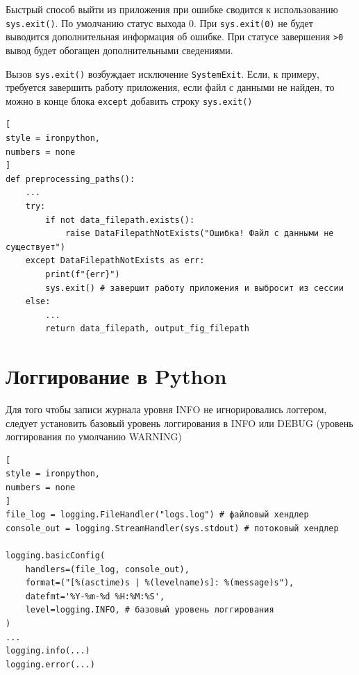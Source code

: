 \documentclass[%
	11pt,
	a4paper,
	utf8,
		]{article}
\begin{document}
Быстрый способ выйти из приложения при ошибке сводится к использованию \texttt{sys.exit()}. По умолчанию статус выхода 0. При \texttt{sys.exit(0)} не будет выводится дополнительная информация об ошибке. При статусе завершения \texttt{>0} вывод будет обогащен дополнительными сведениями.

Вызов \texttt{sys.exit()} возбуждает исключение \texttt{SystemExit}. Если, к примеру, требуется завершить работу приложения, если файл с данными не найден, то можно в конце блока \texttt{except} добавить строку \texttt{sys.exit()}
\begin{lstlisting}[
style = ironpython,
numbers = none	
]
def preprocessing_paths():
    ...
    try:
        if not data_filepath.exists():
            raise DataFilepathNotExists("Ошибка! Файл с данными не существует")
    except DataFilepathNotExists as err:
        print(f"{err}")
        sys.exit() # завершит работу приложения и выбросит из сессии
    else:
        ...
        return data_filepath, output_fig_filepath
\end{lstlisting}


\section{Логгирование в Python}

Для того чтобы записи журнала уровня INFO не игнорировались логгером, следует установить базовый уровень логгирования в INFO или DEBUG (уровень логгирования по умолчанию WARNING)
\begin{lstlisting}[
style = ironpython,
numbers = none	
]
file_log = logging.FileHandler("logs.log") # файловый хендлер
console_out = logging.StreamHandler(sys.stdout) # потоковый хендлер

logging.basicConfig(
    handlers=(file_log, console_out),
    format=("[%(asctime)s | %(levelname)s]: %(message)s"),
    datefmt='%Y-%m-%d %H:%M:%S',
    level=logging.INFO, # базовый уровень логгирования
)
...
logging.info(...)
logging.error(...)
\end{lstlisting}
\end{document}
